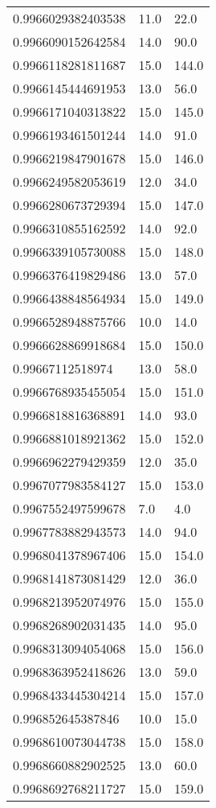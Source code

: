 \begin{center}
\begin{supertabular}[H]{p{0.30\textwidth}p{0.05\textwidth}p{0.05\textwidth}}
0.9966029382403538 & 11.0 & 22.0 \\ 
0.9966090152642584 & 14.0 & 90.0 \\ 
0.9966118281811687 & 15.0 & 144.0 \\ 
0.9966145444691953 & 13.0 & 56.0 \\ 
0.9966171040313822 & 15.0 & 145.0 \\ 
0.9966193461501244 & 14.0 & 91.0 \\ 
0.9966219847901678 & 15.0 & 146.0 \\ 
0.9966249582053619 & 12.0 & 34.0 \\ 
0.9966280673729394 & 15.0 & 147.0 \\ 
0.9966310855162592 & 14.0 & 92.0 \\ 
0.9966339105730088 & 15.0 & 148.0 \\ 
0.9966376419829486 & 13.0 & 57.0 \\ 
0.9966438848564934 & 15.0 & 149.0 \\ 
0.9966528948875766 & 10.0 & 14.0 \\ 
0.9966628869918684 & 15.0 & 150.0 \\ 
0.99667112518974 & 13.0 & 58.0 \\ 
0.9966768935455054 & 15.0 & 151.0 \\ 
0.9966818816368891 & 14.0 & 93.0 \\ 
0.9966881018921362 & 15.0 & 152.0 \\ 
0.9966962279429359 & 12.0 & 35.0 \\ 
0.9967077983584127 & 15.0 & 153.0 \\ 
0.9967552497599678 & 7.0 & 4.0 \\ 
0.9967783882943573 & 14.0 & 94.0 \\ 
0.9968041378967406 & 15.0 & 154.0 \\ 
0.9968141873081429 & 12.0 & 36.0 \\ 
0.9968213952074976 & 15.0 & 155.0 \\ 
0.9968268902031435 & 14.0 & 95.0 \\ 
0.9968313094054068 & 15.0 & 156.0 \\ 
0.9968363952418626 & 13.0 & 59.0 \\ 
0.9968433445304214 & 15.0 & 157.0 \\ 
0.996852645387846 & 10.0 & 15.0 \\ 
0.9968610073044738 & 15.0 & 158.0 \\ 
0.9968660882902525 & 13.0 & 60.0 \\ 
0.9968692768211727 & 15.0 & 159.0 \\ 

\end{supertabular}
\end{center}

